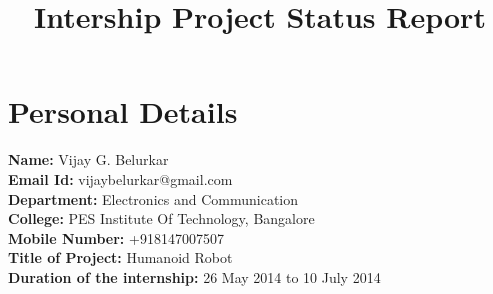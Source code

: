 \documentclass{article}
\begin{document}
\title{Intership Project Status Report}
\maketitle
\section{Personal Details}
\textbf{Name:} Vijay G. Belurkar\\

\hspace{-5mm}\textbf{Email Id:} vijaybelurkar@gmail.com\\

\hspace{-5mm}\textbf{Department:} Electronics and Communication\\

\hspace{-5mm}\textbf{College:} PES Institute Of Technology, Bangalore\\

\hspace{-5mm}\textbf{Mobile Number:} +918147007507\\

\hspace{-5mm}\textbf{Title of Project:} Humanoid Robot\\

\hspace{-5mm}\textbf{Duration of the internship:} 26 May 2014 to 10 July 2014\\
\end{document}
